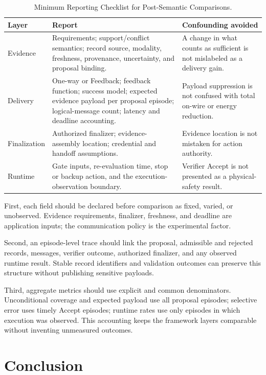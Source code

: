 \begin{table}[!t]
\caption{Minimum Reporting Checklist for Post-Semantic Comparisons.}
\label{tab:checklist}
\centering
\small
\begin{tabularx}{0.95\textwidth}{@{}L{0.16\textwidth}L{0.37\textwidth}X@{}}
\toprule
Layer & Report & Confounding avoided \\
\midrule
Evidence & Requirements; support/conflict semantics; record source, modality,
freshness, provenance, uncertainty, and proposal binding. & A change in what
counts as sufficient is not mislabeled as a delivery gain. \\
Delivery & One-way or Feedback; feedback function; success model; expected
evidence payload per proposal episode; logical-message count; latency and
deadline accounting. & Payload suppression is not confused with total on-wire
or energy reduction. \\
Finalization & Authorized finalizer; evidence-assembly location; credential and
handoff assumptions. & Evidence location is not mistaken for action authority. \\
Runtime & Gate inputs, re-evaluation time, stop or backup action, and the
execution-observation boundary. & Verifier Accept is not presented as a
physical-safety result. \\
\bottomrule
\end{tabularx}
\end{table}

First, each field should be declared before comparison as fixed, varied, or
unobserved. Evidence requirements, finalizer, freshness, and deadline are
application inputs; the communication policy is the experimental factor.

Second, an episode-level trace should link the proposal, admissible and rejected
records, messages, verifier outcome, authorized finalizer, and any observed
runtime result. Stable record identifiers and validation outcomes can preserve
this structure without publishing sensitive payloads.

Third, aggregate metrics should use explicit and common denominators.
Unconditional coverage and expected payload use all proposal episodes;
selective error uses timely Accept episodes; runtime rates use only episodes in
which execution was observed. This accounting keeps the framework layers
comparable without inventing unmeasured outcomes.

\section{Conclusion}


